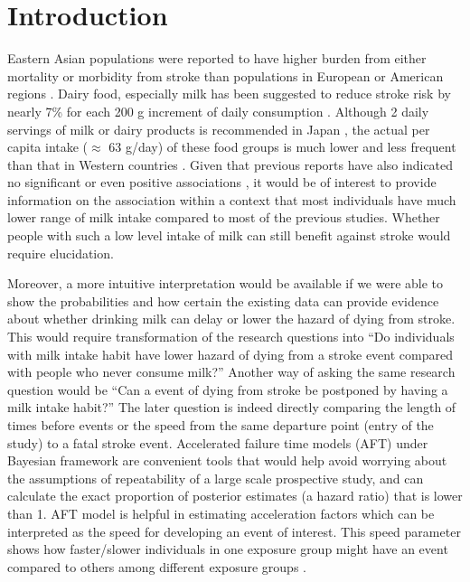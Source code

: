 \documentclass[nutrients,article,submitted,moreauthors,pdftex]{mdpi}
\begin{document}

\hypertarget{introduction}{%
\section{Introduction}\label{introduction}}

Eastern Asian populations were reported to have higher burden from
either mortality or morbidity from stroke than populations in European
or American regions \citep{Kim2014}. Dairy food, especially milk has
been suggested to reduce stroke risk by nearly 7\% for each 200 g
increment of daily consumption \citep{DeGoede2016}. Although 2 daily
servings of milk or dairy products is recommended in Japan
\citep{Yoshiike2007}, the actual per capita intake (\(\approx\) 63
g/day) of these food groups is much lower and less frequent than that in
Western countries \citep{Saito2019}. Given that previous reports have
also indicated no significant
\citep{Iso1999, sauvaget2003intake, Elwood2004} or even positive
associations \citep{Larsson2009}, it would be of interest to provide
information on the association within a context that most individuals
have much lower range of milk intake compared to most of the previous
studies. Whether people with such a low level intake of milk can still
benefit against stroke would require elucidation.

Moreover, a more intuitive interpretation would be available if we were
able to show the probabilities and how certain the existing data can
provide evidence about whether drinking milk can delay or lower the
hazard of dying from stroke. This would require transformation of the
research questions into ``Do individuals with milk intake habit have
lower hazard of dying from a stroke event compared with people who never
consume milk?'' Another way of asking the same research question would
be ``Can a event of dying from stroke be postponed by having a milk
intake habit?'' The later question is indeed directly comparing the
length of times before events or the speed from the same departure point
(entry of the study) to a fatal stroke event. Accelerated failure time
models (AFT) under Bayesian framework are convenient tools that would
help avoid worrying about the assumptions of repeatability of a large
scale prospective study, and can calculate the exact proportion of
posterior estimates (a hazard ratio) that is lower than 1. AFT model is
helpful in estimating acceleration factors which can be interpreted as
the speed for developing an event of interest. This speed parameter
shows how faster/slower individuals in one exposure group might have an
event compared to others among different exposure groups
\citep{Wei1992, ibrahim2014b}.
\end{document}
